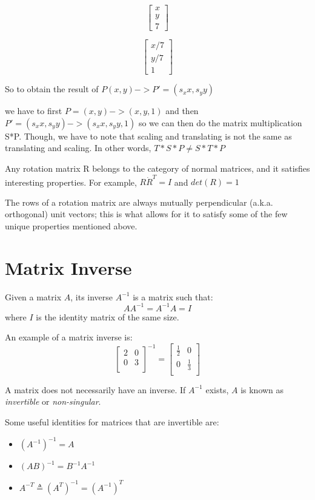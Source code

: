 \documentclass{article}
\begin{document}
\[
  \begin{bmatrix}
    x \\
    y \\
    7
  \end{bmatrix}
\]

\[
    \begin{bmatrix}
    x/7 \\
    y/7 \\
    1
  \end{bmatrix}
  \]

So to obtain the result of
$P(x,y) -> P' = (s_x x, s_y y)$

we have to first $P = (x, y) -> (x,y,1)$ and then $P' = (s_x x, s_y y) -> (s_x x, s_y y, 1)$ so we can then do the matrix multiplication S*P. Though, we have  to note that scaling and translating is not the same as translating and scaling. In other words, $T*S*P \neq S*T*P$

Any rotation matrix R belongs to the category of normal matrices, and it satisfies interesting properties. For example, $R \dot R^T = I$ and $det(R) = 1$

The rows of a rotation matrix are always mutually perpendicular (a.k.a. orthogonal) unit vectors; this is what allows for it to satisfy some of the few unique properties mentioned above.

\section{Matrix Inverse}
Given a matrix $A$, its inverse $A^{-1}$ is a matrix such that:
$$AA^{-1} = A^{-1}A = I$$
where $I$ is the identity matrix of the same size.

An example of a matrix inverse is:
$$
  \begin{bmatrix}
    2 & 0 \\
    0 & 3 \\
  \end{bmatrix}^{-1}
  =
  \begin{bmatrix}
    \frac{1}{2} & 0 \\
    0 & \frac{1}{3} \\
  \end{bmatrix}
$$

A matrix does not necessarily have an inverse. If $A^{-1}$ exists, $A$ is known as \textit{invertible} or \textit{non-singular}.

Some useful identities for matrices that are invertible are:
\begin{itemize}
\item $(A^{-1})^{-1} = A$
\item $(AB)^{-1} = B^{-1}A^{-1}$
\item $A^{-T} \triangleq (A^T)^{-1} = (A^{-1})^T$
\end{itemize}
\end{document}
